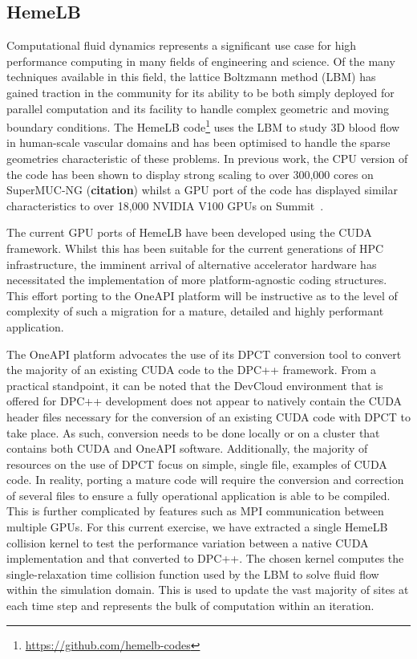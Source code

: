 
\subsection{HemeLB}\label{sec:hemelb}

Computational fluid dynamics represents a significant use case for high performance computing in many fields of engineering and science.
Of the many techniques available in this field, the lattice Boltzmann method (LBM) has gained traction in the community for its ability to be both simply deployed for parallel computation and its facility to handle complex geometric and moving boundary conditions.
The HemeLB code\footnote{\url{https://github.com/hemelb-codes}} uses the LBM to study 3D blood flow in human-scale vascular domains and has been optimised to handle the sparse geometries characteristic of these problems.
In previous work, the CPU version of the code has been shown to display strong scaling to over 300,000 cores on SuperMUC-NG (\textbf{citation}) whilst a GPU port of the code has displayed similar characteristics to over 18,000 NVIDIA V100 GPUs on Summit~\cite{zacharoudiou_development_2022}.

The current GPU ports of HemeLB have been developed using the CUDA framework.
Whilst this has been suitable for the current generations of HPC infrastructure, the imminent arrival of alternative accelerator hardware has necessitated the implementation of more platform-agnostic coding structures.
This effort porting to the OneAPI platform will be instructive as to the level of complexity of such a migration for a mature, detailed and highly performant application.

The OneAPI platform advocates the use of its DPCT conversion tool to convert the majority of an existing CUDA code to the DPC++ framework.
From a practical standpoint, it can be noted that the DevCloud environment that is offered for DPC++ development does not appear to natively contain the CUDA header files necessary for the conversion of an existing CUDA code with DPCT to take place.
As such, conversion needs to be done locally or on a cluster that contains both CUDA and OneAPI software.
Additionally, the majority of resources on the use of DPCT focus on simple, single file, examples of CUDA code.
In reality, porting a mature code will require the conversion and correction of several files to ensure a fully operational application is able to be compiled.
This is further complicated by features such as MPI communication between multiple GPUs.
For this current exercise, we have extracted a single HemeLB collision kernel to test the performance variation between a native CUDA implementation and that converted to DPC++.
The chosen kernel computes the single-relaxation time collision function used by the LBM to solve fluid flow within the simulation domain.
This is used to update the vast majority of sites at each time step and represents the bulk of computation within an iteration.

